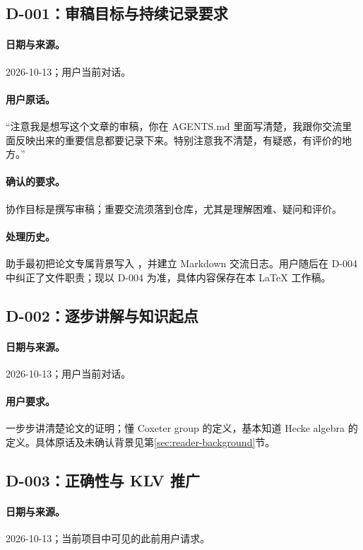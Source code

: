 \subsection{D-001：审稿目标与持续记录要求}\label{dialogue:D001}
\paragraph{日期与来源。}2026-10-13；用户当前对话。
\paragraph{用户原话。}“注意我是想写这个文章的审稿，你在 AGENTS.md 里面写清楚，我跟你交流里面反映出来的重要信息都要记录下来。特别注意我不清楚，有疑惑，有评价的地方。”
\paragraph{确认的要求。}协作目标是撰写审稿；重要交流须落到仓库，尤其是理解困难、疑问和评价。
\paragraph{处理历史。}助手最初把论文专属背景写入 ，并建立 Markdown 交流日志。用户随后在 D-004 中纠正了文件职责；现以 D-004 为准，具体内容保存在本 LaTeX 工作稿。

\subsection{D-002：逐步讲解与知识起点}\label{dialogue:D002}
\paragraph{日期与来源。}2026-10-13；用户当前对话。
\paragraph{用户要求。}一步步讲清楚论文的证明；懂 Coxeter group 的定义，基本知道 Hecke algebra 的定义。具体原话及未确认背景见第\ref{sec:reader-background}节。

\subsection{D-003：正确性与 KLV 推广}\label{dialogue:D003}
\paragraph{日期与来源。}2026-10-13；当前项目中可见的此前用户请求。
